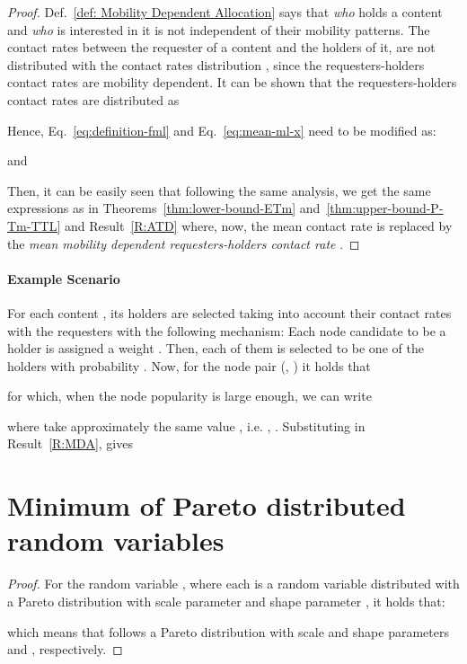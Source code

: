 \documentclass[journal]{IEEEtran}
\newcommand{\eq}[1]{Eq.~\eqref{#1}}
\begin{document}
\begin{proof}
Def.~\ref{def: Mobility Dependent Allocation} says that \textit{who} holds a content and \textit{who} is interested in it is not independent of their mobility patterns. The contact rates between the requester of a content and the holders of it, are not distributed with the contact rates distribution , since the requesters-holders contact rates are mobility dependent. It can be shown that the requesters-holders contact rates are distributed as~\cite{pavlos-TMC-traffic}

Hence, \eq{eq:definition-fml} and \eq{eq:mean-ml-x} need to be modified as:

and

Then, it can be easily seen that following the same analysis, we get the same expressions as in Theorems~\ref{thm:lower-bound-ETm} and~\ref{thm:upper-bound-P-Tm-TTL} and Result~\ref{R:ATD} where, now, the mean contact rate  is replaced by the \textit{mean mobility dependent requesters-holders contact rate} .
\end{proof}

\paragraph*{Example Scenario} For each content , its holders are selected taking into account their contact rates with the requesters with the following mechanism: Each node  candidate to be a holder is assigned a weight . Then, each of them is selected to be one of the  holders with probability . Now, for the node pair  (, ) it holds that

for which, when the node popularity  is large enough, we can write

where  take approximately the same value , i.e. , . Substituting  in Result~\ref{R:MDA}, gives




\section{Minimum of Pareto distributed random variables}\label{appendix:min-pareto}

\begin{proof}
For the random variable , where each  is a random variable distributed with a Pareto distribution with scale parameter  and shape parameter , it holds that:

which means that  follows a Pareto distribution with scale and shape parameters  and , respectively. 
\end{proof}
\end{document}
